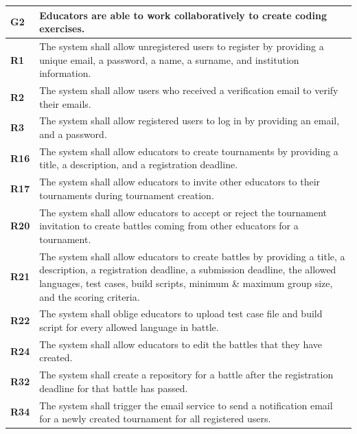 \begin{table}[h!]
  \centering
  \begin{tabular}{lp{15cm}}
    \hline
    \textbf{G2} & Educators are able to work collaboratively to create coding exercises. \\
    \hline
    \hline
    \textbf{R1} & The system shall allow unregistered users to register by providing a unique email, a password, a name, a surname, and institution information. \\

    \textbf{R2} & The system shall allow users who received a verification email to verify their emails. \\

    \textbf{R3} & The system shall allow registered users to log in by providing an email, and a password. \\

    \textbf{R16} & The system shall allow educators to create tournaments by providing a title, a description, and a registration deadline. \\

    \textbf{R17} & The system shall allow educators to invite other educators to their tournaments during tournament creation. \\

     \textbf{R20} & The system shall allow educators to accept or reject the tournament invitation to create battles
coming from other educators for a tournament. \\

    \textbf{R21} & The system shall allow educators to create battles by providing a title, a description, a registration deadline, a submission deadline, the allowed languages, test cases, build scripts, minimum \& maximum group size, and the scoring criteria. \\

    \textbf{R22} & The system shall oblige educators to upload test case file and build script for every allowed language in battle. \\

    \textbf{R24} & The system shall allow educators to edit the battles that they have created. \\

    \textbf{R32} & The system shall create a repository for a battle after the registration deadline for that battle has passed. \\

    \textbf{R34} & The system shall trigger the email service to send a notification email for a newly created tournament for all registered users. \\


\end{tabular}
\end{table}

